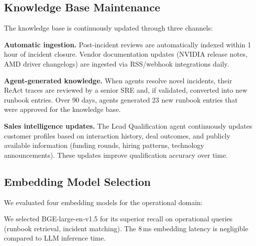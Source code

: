 \documentclass[conference,10pt,letterpaper]{IEEEtran}
\begin{document}
\subsection{Knowledge Base Maintenance}

The knowledge base is continuously updated through three channels:

\textbf{Automatic ingestion.} Post-incident reviews are automatically indexed within 1 hour of incident closure. Vendor documentation updates (NVIDIA release notes, AMD driver changelogs) are ingested via RSS/webhook integrations daily.

\textbf{Agent-generated knowledge.} When agents resolve novel incidents, their ReAct traces are reviewed by a senior SRE and, if validated, converted into new runbook entries. Over 90 days, agents generated 23 new runbook entries that were approved for the knowledge base.

\textbf{Sales intelligence updates.} The Lead Qualification agent continuously updates customer profiles based on interaction history, deal outcomes, and publicly available information (funding rounds, hiring patterns, technology announcements). These updates improve qualification accuracy over time.

\subsection{Embedding Model Selection}

We evaluated four embedding models for the operational domain:

\begin{table}[!t]
\caption{Embedding Model Comparison for Operational RAG}
\label{tab:embeddings}
\centering\scriptsize
{}
\end{table}

We selected BGE-large-en-v1.5 for its superior recall on operational queries (runbook retrieval, incident matching). The 8\,ms embedding latency is negligible compared to LLM inference time.
\end{document}
